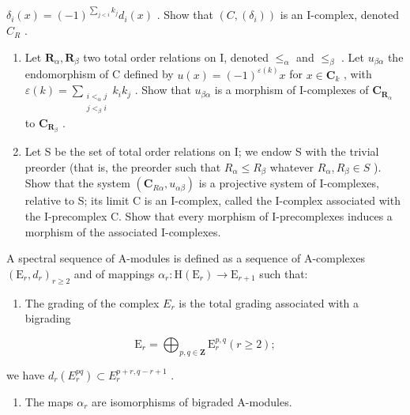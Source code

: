 \(\delta_{i}(x) = (-1)^{\sum_{j < i} k_{j}} d_{i}(x)\) . Show that \((C, (\delta_{i}))\) is an I-complex, denoted \(C_{R}\) .

\begin{enumerate}
\def\labelenumi{\alph{enumi})}
\setcounter{enumi}{2}
\item
  Let \(\mathbf{R}_{\alpha}, \mathbf{R}_{\beta}\) two total order relations on I, denoted \(\leqslant_{\alpha}\) and \(\leqslant_{\beta}\) . Let \(u_{\beta \alpha}\) the endomorphism of C defined by \(u(x) = (-1)^{\varepsilon(k)} x\) for \(x \in \mathbf{C}_k\) , with \(\varepsilon(k) = \sum_{\substack{i < _{\alpha} j \\ j < _{\beta} i}} k_i k_j\) . Show that \(u_{\beta \alpha}\) is a morphism of I-complexes of \(\mathbf{C}_{\mathbf{R}_{\alpha}}\) to \(\mathbf{C}_{\mathbf{R}_{\beta}}\) .
\item
  Let S be the set of total order relations on I; we endow S with the trivial preorder (that is, the preorder such that \(R_{\alpha} \leqslant R_{\beta}\) whatever \(R_{\alpha}, R_{\beta} \in S\) ). Show that the system \((\mathbf{C}_{R\alpha}, u_{\alpha\beta})\) is a projective system of I-complexes, relative to S; its limit C is an I-complex, called the I-complex associated with the I-precomplex C. Show that every morphism of I-precomplexes induces a morphism of the associated I-complexes.
\end{enumerate}

A spectral sequence of A-modules is defined as a sequence of A-complexes \((\mathrm{E}_r, d_r)_{r \geqslant 2}\) and of mappings \(\alpha_r: \mathrm{H}(\mathrm{E}_r) \to \mathrm{E}_{r+1}\) such that:

\begin{enumerate}
\def\labelenumi{(\roman{enumi})}
\tightlist
\item
  The grading of the complex \(E_r\) is the total grading associated with a bigrading
\end{enumerate}

\[
\mathrm{E} _ {r} = \bigoplus_ {p, q \in \mathbf {Z}} \mathrm{E} _ {r} ^ {p, q} (r \geqslant 2);
\]

we have \(d_r(E_r^{pq}) \subset E_r^{p + r,q - r + 1}\) .

\begin{enumerate}
\def\labelenumi{(\roman{enumi})}
\setcounter{enumi}{1}
\tightlist
\item
  The maps \(\alpha_{r}\) are isomorphisms of bigraded A-modules.
\end{enumerate}

